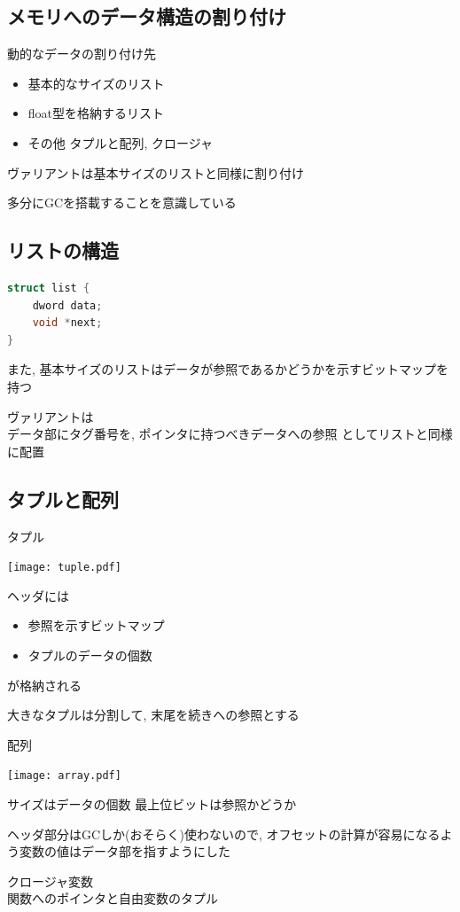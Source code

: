 \documentclass[papersize,30pt,slide]{jsarticle}
\begin{document}
\subsection{メモリへのデータ構造の割り付け}
動的なデータの割り付け先
\begin{itemize}
\item 基本的なサイズのリスト
\item float型を格納するリスト
\item その他 タプルと配列, クロージャ
\end{itemize}
ヴァリアントは基本サイズのリストと同様に割り付け

多分にGCを搭載することを意識している

\newpage
\subsection{リストの構造}
\begin{lstlisting}[language=C]
struct list {
    dword data;
    void *next;
}
\end{lstlisting}
また, 基本サイズのリストはデータが参照であるかどうかを示すビットマップを持つ

\vspace{1em}

ヴァリアントは \\
データ部にタグ番号を, ポインタに持つべきデータへの参照
としてリストと同様に配置

\newpage
\subsection{タプルと配列}
タプル

\texttt{[image: tuple.pdf]}

ヘッダには
\begin{itemize}
\item 参照を示すビットマップ
\item タプルのデータの個数
\end{itemize}
が格納される

大きなタプルは分割して, 末尾を続きへの参照とする

\newpage

配列

\texttt{[image: array.pdf]}

サイズはデータの個数 最上位ビットは参照かどうか

\vspace{1em}

ヘッダ部分はGCしか(おそらく)使わないので, オフセットの計算が容易になるよう変数の値はデータ部を指すようにした

\vspace{1em}

クロージャ変数 \\
関数へのポインタと自由変数のタプル
\end{document}
